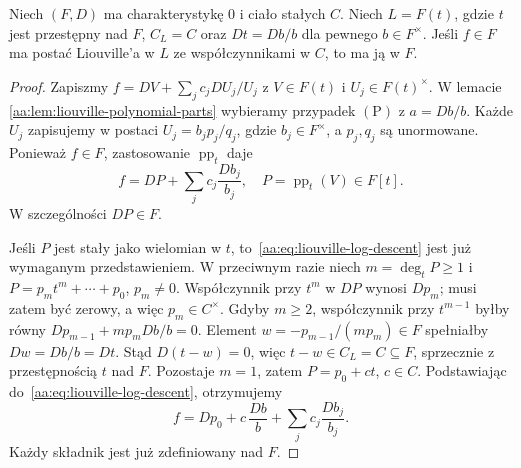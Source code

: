 \begin{lemat}
\label{aa:lem:liouville-log-descent}
Niech $(F,D)$ ma charakterystykę $0$ i ciało
stałych $C$. Niech $L=F(t)$, gdzie $t$ jest
przestępny nad $F$, $C_L=C$ oraz
$Dt=Db/b$ dla pewnego $b\in F^\times$.
Jeśli $f\in F$ ma postać Liouville'a w $L$
ze współczynnikami w $C$, to ma ją w $F$.
\end{lemat}
\begin{proof}
Zapiszmy
$f=DV+\sum_j c_j DU_j/U_j$ z $V\in F(t)$
i $U_j\in F(t)^\times$. W lemacie
\ref{aa:lem:liouville-polynomial-parts}
wybieramy przypadek $(\mathrm P)$ z $a=Db/b$.
Każde $U_j$ zapisujemy w postaci
$U_j=b_j p_j/q_j$, gdzie
$b_j\in F^\times$, a $p_j,q_j$ są unormowane.
Ponieważ $f\in F$, zastosowanie
$\operatorname{pp}_t$ daje
\begin{equation}\label{aa:eq:liouville-log-descent}
 f=DP+\sum_j c_j\frac{Db_j}{b_j},
 \quad P=\operatorname{pp}_t(V)\in F[t].
\end{equation}
W szczególności $DP\in F$.

Jeśli $P$ jest stały jako wielomian w $t$,
to~\eqref{aa:eq:liouville-log-descent} jest
już wymaganym przedstawieniem. W przeciwnym
razie niech $m=\deg_tP\ge1$ i
$P=p_mt^m+\cdots+p_0$, $p_m\ne0$.
Współczynnik przy $t^m$ w $DP$ wynosi
$Dp_m$; musi zatem być zerowy, a więc
$p_m\in C^\times$.
Gdyby $m\ge2$, współczynnik przy $t^{m-1}$
byłby równy $Dp_{m-1}+mp_m Db/b=0$.
Element $w=-p_{m-1}/(mp_m)\in F$
spełniałby $Dw=Db/b=Dt$.
Stąd $D(t-w)=0$, więc $t-w\in C_L=C\subseteq F$,
sprzecznie z przestępnością $t$ nad $F$.
Pozostaje $m=1$, zatem $P=p_0+ct$, $c\in C$.
Podstawiając do~\eqref{aa:eq:liouville-log-descent},
otrzymujemy
\[
 f=Dp_0+c\,\frac{Db}{b}
              +\sum_j c_j\frac{Db_j}{b_j}.
\]
Każdy składnik jest już zdefiniowany nad $F$.
\end{proof}

